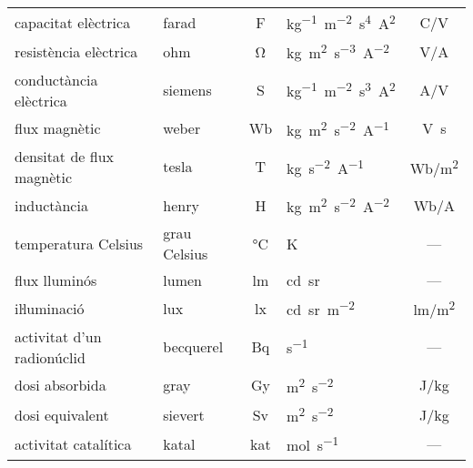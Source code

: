 \begin{ThreePartTable}
\begin{longtable}[h]{llclc}
   capacitat elèctrica & farad & F   & \unit{kg^{-1}.m^{-2}.s^4.A^2}& \unit{C/V}\\
   resistència elèctrica & ohm &  \unit{\ohm}  & \unit{kg.m^2.s^{-3}.A^{-2}} & \unit{V/A}\\
   conductància elèctrica & siemens &  S  & \unit{kg^{-1}.m^{-2}.s^3.A^2} & \unit{A/V}\\
   flux magnètic & weber &  Wb  & \unit{kg.m^2.s^{-2}.A^{-1}} & \unit{V.s}\\
   densitat de flux magnètic & tesla &  T  & \unit{kg.s^{-2}.A^{-1}} & \unit{Wb/m^2}\\
   inductància & henry &  H  & \unit{kg.m^2.s^{-2}.A^{-2}} & \unit{Wb/A}\\
   temperatura Celsius & grau Celsius &  \unit{\degreeCelsius} & \unit{K} & --- \\
   flux lluminós & lumen & lm  & \unit{cd.sr}& ---\\
   iŀluminació & lux & lx & \unit{cd.sr.m^{-2}} & \unit{lm/m^2} \\
   activitat  d'un radionúclid & becquerel & Bq& \unit{s^{-1}} & --- \\
   dosi absorbida & gray & Gy  & \unit{m^2.s^{-2}}& \unit{J/kg}\\
   dosi equivalent & sievert & Sv  & \unit{m^2.s^{-2}}& \unit{J/kg}\\
   activitat catalítica & katal & kat & \unit{mol.s^{-1}} & ---\\
   \bottomrule[1pt]
\end{longtable}
\end{ThreePartTable}
       
   
    
   
   
   
   
    
 
   
  
   
     
\index{\unit{\ohm}}    
\index{\unit{\degreeCelsius}}    


